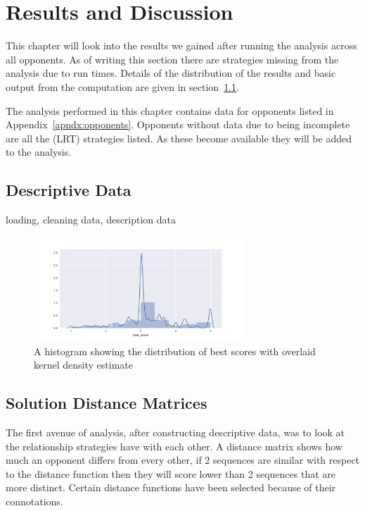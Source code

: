 \chapter{Results and Discussion}\label{ch:results}
This chapter will look into the results we gained after running the analysis across all opponents.
As of writing this section there are strategies missing from the analysis due to run times.
Details of the distribution of the results and basic output from the computation are given in section~\ref{sec:descriptive_data}.

The analysis performed in this chapter contains data for opponents listed in Appendix~\ref{apndx:opponents}.
Opponents without data due to being incomplete are all the (LRT) strategies listed.
As these become available they will be added to the analysis.

\section{Descriptive Data}\label{sec:descriptive_data}
loading, cleaning data, description data

\begin{figure}[ht]
    \includegraphics[width=0.7\textwidth, center]{./img/descriptive/best_score_hist.pdf}
    \caption{A histogram showing the distribution of best scores with overlaid kernel density estimate}\label{fig:best_score_hist}
\end{figure}

\section{Solution Distance Matrices}
The first avenue of analysis, after constructing descriptive data, was to look at the relationship strategies have with each other.
A distance matrix shows how much an opponent differs from every other, if 2 sequences are similar with respect to the distance function then they will score lower than 2 sequences that are more distinct.
Certain distance functions have been selected because of their connotations.

